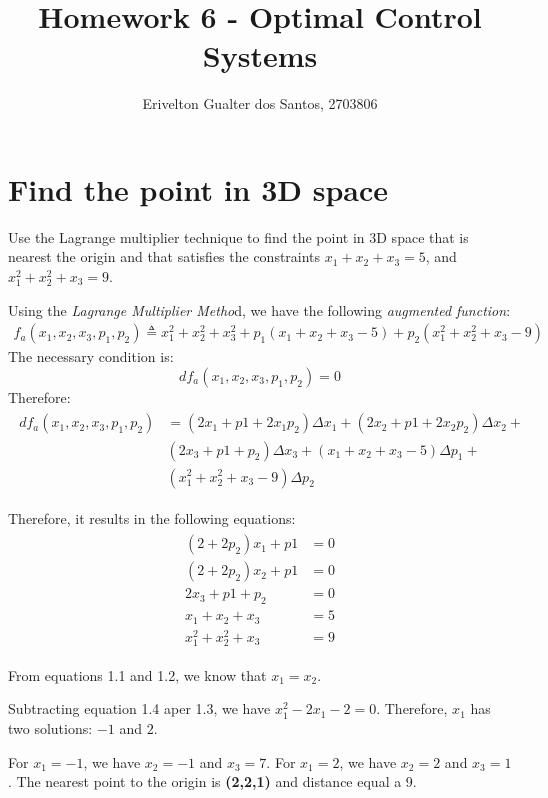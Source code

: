 \documentclass{article}
\begin{document}
\title{Homework 6 - Optimal Control Systems}
\author{Erivelton Gualter dos Santos, 2703806}
\date{}

\maketitle 

\section{Find the point in 3D space}

Use the Lagrange multiplier technique to find the point in 3D space that is nearest the origin and that satisfies the constraints $x_1+x_2+x_3=5$, and $x_1^2+x_2^2+x_3=9$.

Using the \textit{Lagrange Multiplier Metho}d, we have the following \textit{augmented function}:
\begin{eqnarray*}
f_a(x_1,x_2,x_3,p_1,p_2)  \triangleq x_1^2+x_2^2+x_3^2 + p_1(x_1+x_2+x_3-5) + p_2(x_1^2+x_2^2+x_3-9)
\end{eqnarray*}
The necessary condition is: 
$$ df_a(x_1,x_2,x_3,p_1,p_2) = 0$$
Therefore:
\begin{eqnarray*}
\begin{split}
df_a(x_1,x_2,x_3,p_1,p_2) &= (2x_1+p1+2x_1p_2)\Delta x_1 + (2x_2+p1+2x_2p_2)\Delta x_2 + \\
& (2x_3+p1+p_2)\Delta x_3 + (x_1+x_2+x_3-5)\Delta p_1 + \\
& (x_1^2+x_2^2+x_3-9)\Delta p_2
\end{split}
\end{eqnarray*}

Therefore, it results in the following equations:
\begin{eqnarray}
\begin{split}
(2+2p_2)x_1 + p1 &= 0 \\
(2+2p_2)x_2 + p1 &= 0 \\
2x_3+p1+p_2 &= 0 \\
x_1+x_2+x_3 &= 5 \\
x_1^2+x_2^2+x_3 &= 9
\end{split}
\end{eqnarray}

From equations 1.1 and 1.2, we know that $x_1 = x_2$.

Subtracting equation 1.4 aper 1.3, we have $x_1^2-2x_1-2=0$. Therefore, $x_1$ has two solutions: $-1$ and $2$.

For $x_1 = -1$, we have $x_2 = -1$ and $x_3 = 7$. For $x_1 = 2$, we have $x_2 = 2$ and $x_3 = 1$. The nearest point to the origin is \textbf{(2,2,1)} and distance equal a 9.
\end{document}
